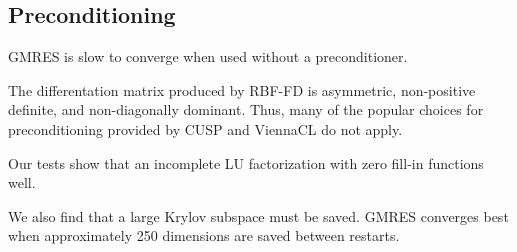 \subsection{Preconditioning} 


GMRES is slow to converge when used without a preconditioner. 

The differentation matrix produced by RBF-FD is asymmetric, non-positive definite, and non-diagonally dominant. Thus, many of the popular choices for preconditioning provided by CUSP and ViennaCL do not apply. 

Our tests show that an incomplete LU factorization with zero fill-in \cite{Saad2003} functions well. 

We also find that a large Krylov subspace must be saved. GMRES converges best when approximately 250 dimensions are saved between restarts. 









